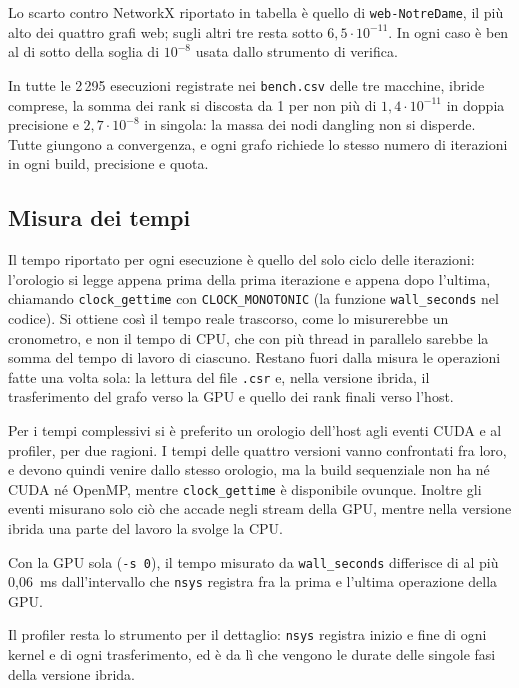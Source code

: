 \documentclass[11pt,a4paper]{article}
\newcommand{\stacco}{\par\medskip\noindent}
\begin{document}
\stacco
Lo scarto contro NetworkX riportato in tabella è quello di
\texttt{web-NotreDame}, il più alto dei quattro grafi web; sugli altri tre
resta sotto $6{,}5\cdot10^{-11}$. In ogni caso è ben al di sotto della soglia di
$10^{-8}$ usata dallo strumento di verifica.
\stacco
In tutte le 2\,295 esecuzioni registrate nei \texttt{bench.csv} delle tre macchine, ibride comprese, la somma dei
rank si discosta da 1 per non più di $1{,}4\cdot10^{-11}$ in doppia precisione
e $2{,}7\cdot10^{-8}$ in singola: la massa dei nodi dangling non si disperde.
Tutte giungono a convergenza, e ogni grafo richiede lo stesso numero di
iterazioni in ogni build, precisione e quota.

\subsection{Misura dei tempi}
\label{sec:misura}
Il tempo riportato per ogni esecuzione è quello del solo ciclo delle
iterazioni: l'orologio si legge appena prima della prima iterazione e appena
dopo l'ultima, chiamando \texttt{clock\_gettime} con \texttt{CLOCK\_MONOTONIC}
(la funzione \texttt{wall\_seconds} nel codice). Si ottiene così il tempo reale
trascorso, come lo misurerebbe un cronometro, e non il tempo di CPU, che con
più thread in parallelo sarebbe la somma del tempo di lavoro di ciascuno.
Restano fuori dalla misura le operazioni fatte
una volta sola: la lettura del file \texttt{.csr} e, nella versione ibrida, il
trasferimento del grafo verso la GPU e quello dei rank finali verso l'host.

\stacco
Per i tempi complessivi si è preferito un orologio dell'host agli eventi
CUDA e al profiler,
per due ragioni. I tempi delle quattro versioni vanno confrontati fra loro, e
devono quindi venire dallo stesso orologio, ma la build sequenziale non ha né
CUDA né OpenMP, mentre \texttt{clock\_gettime} è disponibile ovunque. Inoltre
gli eventi misurano solo ciò che accade negli stream della GPU, mentre nella
versione ibrida una parte del lavoro la svolge la CPU.

\stacco
Con la GPU sola (\texttt{-s 0}), il tempo misurato da
\texttt{wall\_seconds} differisce di al più 0,06~ms dall'intervallo che
\texttt{nsys} registra fra la prima e l'ultima operazione della GPU.

\stacco
Il profiler resta lo strumento per il dettaglio: \texttt{nsys}
registra inizio e fine di ogni kernel e di ogni trasferimento, ed è da lì che
vengono le durate delle singole fasi della versione ibrida.
\end{document}
